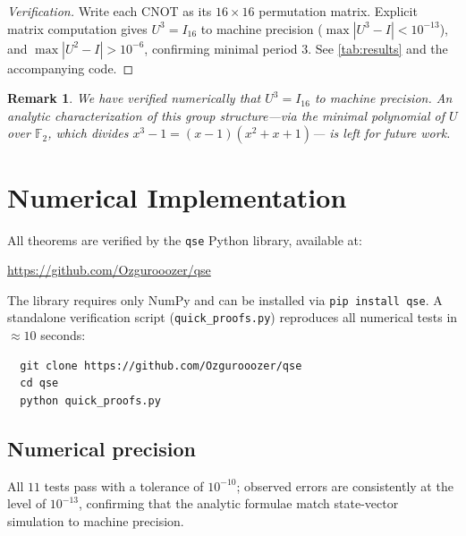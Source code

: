 \documentclass[11pt,a4paper]{article}
\newtheorem{remark}[theorem]{Remark}
\newcommand{\F}{\mathbb{F}}
\begin{document}
\begin{proof}[Verification]
Write each CNOT as its $16 \times 16$ permutation matrix.  Explicit matrix
computation gives $U^3 = I_{16}$ to machine precision
($\max|U^3 - I| < 10^{-13}$), and $\max|U^2 - I| > 10^{-6}$, confirming
minimal period 3.  See \cref{tab:results} and the accompanying code.
\end{proof}

\begin{remark}
We have verified numerically that $U^3 = I_{16}$ to machine precision.
An analytic characterization of this group structure---via the minimal
polynomial of $U$ over $\F_2$, which divides $x^3 - 1 = (x-1)(x^2+x+1)$---
is left for future work.
\end{remark}

\section{Numerical Implementation}
\label{sec:implementation}

All theorems are verified by the \texttt{qse} Python library, available at:

\begin{center}
\url{https://github.com/Ozgurooozer/qse}
\end{center}

The library requires only NumPy and can be installed via
\texttt{pip install qse}.  A standalone verification script
(\texttt{quick\_proofs.py}) reproduces all numerical tests in
$\approx 10$ seconds:

\begin{verbatim}
  git clone https://github.com/Ozgurooozer/qse
  cd qse
  python quick_proofs.py
\end{verbatim}

\subsection{Numerical precision}

All $11$ tests pass with a tolerance of $10^{-10}$; observed errors are
consistently at the level of $10^{-13}$, confirming that the analytic formulae
match state-vector simulation to machine precision.
\end{document}
